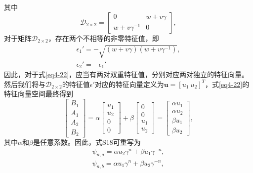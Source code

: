 其中
\begin{equation}\label{eq4-23}
    \mathcal{D}_{2\times2}=\begin{bmatrix}0&w + v\gamma\\w + v\gamma^{-1}&0\end{bmatrix},
\end{equation}
对于矩阵\(\mathcal{D}_{2\times2}\)，存在两个不相等的非零特征值，即
\begin{equation}\label{eq4-24}
    \begin{split}
        \epsilon_{1}' = -\sqrt{(w + v\gamma)(w + v\gamma^{-1})},\\
        \epsilon_{2}' = -\epsilon_{1}'
    \end{split}
\end{equation}
因此，对于式\ref{eq4-22}，应当有两对双重特征值，分别对应两对独立的特征向量。然后我们将与\(\mathcal{D}_{2\times2}\)的特征值\(\epsilon'\)对应的特征向量定义为\(\mathbf{u} = [u_{1}\ u_{2}]^{T}\)，式\ref{eq4-22}的特征向量空间最终得到
\begin{equation}\label{eq4-25}
    \begin{bmatrix}B_{1}\\A_{1}\\A_{2}\\B_{2}\end{bmatrix}=\alpha\begin{bmatrix}u_{1}\\u_{2}\\0\\0\end{bmatrix}+\beta\begin{bmatrix}0\\0\\u_{1}\\u_{2}\end{bmatrix}=\begin{bmatrix}\alpha u_{1}\\\alpha u_{2}\\\beta u_{1}\\\beta u_{2}\end{bmatrix},
\end{equation}
其中\(\alpha\)和\(\beta\)是任意系数。因此，式S18可重写为
\begin{equation}\label{eq4-26}
    \begin{split}
        \psi_{n,a}=\alpha u_{2}\gamma^{n}+\beta u_{1}\gamma^{-n},\\
        \psi_{n,b}=\alpha u_{1}\gamma^{n}+\beta u_{2}\gamma^{-n},
    \end{split}
\end{equation}
